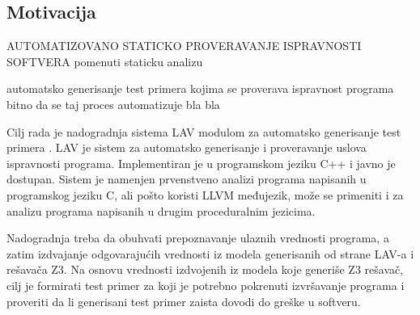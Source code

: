 \documentclass[12pt,oneside]{memoir}
\begin{document}


\subsection{Motivacija}
AUTOMATIZOVANO STATICKO PROVERAVANJE ISPRAVNOSTI SOFTVERA pomenuti staticku analizu

automatsko generisanje test primera kojima se proverava ispravnost programa bitno da se taj proces automatizuje bla bla 

Cilj rada je nadogradnja sistema LAV modulom za automatsko generisanje test primera \cite{LAVTool}. LAV je sistem za automatsko generisanje i proveravanje uslova ispravnosti programa. Implementiran je u programskom jeziku C++ i javno je dostupan. Sistem je namenjen prvenstveno analizi programa napisanih u programskog jeziku C, ali pošto koristi LLVM međujezik, može se primeniti i za analizu programa napisanih u drugim proceduralnim jezicima. 
\par
Nadogradnja treba da obuhvati prepoznavanje ulaznih vrednosti programa, a zatim izdvajanje odgovarajućih vrednosti iz modela generisanih od strane LAV-a i rešavača Z3. Na osnovu vrednosti izdvojenih iz modela koje generiše Z3 rešavač, cilj je formirati test primer za koji je potrebno pokrenuti izvršavanje programa i proveriti da li generisani test primer zaista dovodi do greške u softveru. 
\end{document}
